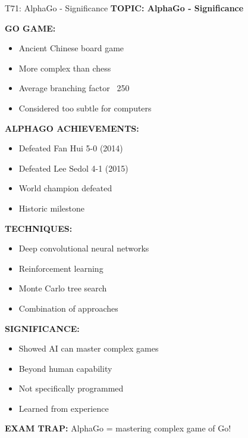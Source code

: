 \documentclass[8pt]{beamer}
\begin{document}
	\begin{frame}{T71: AlphaGo - Significance}
		\fontsize{6.5}{7.5}\selectfont
		\textbf{TOPIC: AlphaGo - Significance}
		
		\vspace{0.1cm}
		\textbf{GO GAME:}
		\begin{itemize}
			\item Ancient Chinese board game
			\item More complex than chess
			\item Average branching factor ~250
			\item Considered too subtle for computers
		\end{itemize}
		
		\vspace{0.1cm}
		\textbf{ALPHAGO ACHIEVEMENTS:}
		\begin{itemize}
			\item Defeated Fan Hui 5-0 (2014)
			\item Defeated Lee Sedol 4-1 (2015)
			\item World champion defeated
			\item Historic milestone
		\end{itemize}
		
		\vspace{0.1cm}
		\textbf{TECHNIQUES:}
		\begin{itemize}
			\item Deep convolutional neural networks
			\item Reinforcement learning
			\item Monte Carlo tree search
			\item Combination of approaches
		\end{itemize}
		
		\vspace{0.1cm}
		\textbf{SIGNIFICANCE:}
		\begin{itemize}
			\item Showed AI can master complex games
			\item Beyond human capability
			\item Not specifically programmed
			\item Learned from experience
		\end{itemize}
		
		\textcolor{myred}{\textbf{EXAM TRAP:}} AlphaGo = \textcolor{myblue}{mastering complex game of Go}!
	\end{frame}
	
\end{document}
